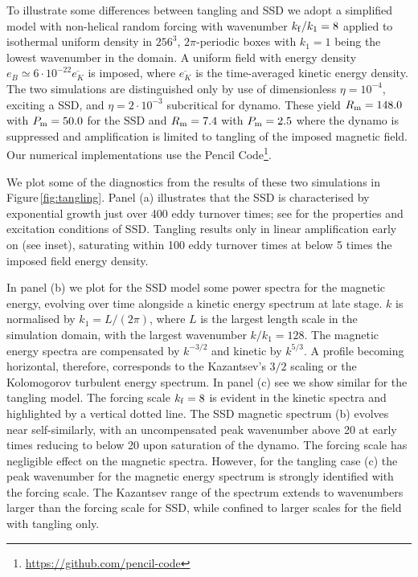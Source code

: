 \documentclass[preprint2]{aastex63}
\newcommand\kf{k_{\rm f} }
\begin{document}
To illustrate some differences between tangling and SSD we adopt
a simplified model with non-helical random forcing with wavenumber $\kf/k_1=8$
applied to isothermal uniform density in $256^3$, $2\pi$-periodic boxes with
$k_1=1$ being the lowest wavenumber in the domain.
A uniform field with energy density $e_B\simeq6\cdot10^{-22}\overline{e_K}$ is
imposed, where $\overline{e_K}$ is the time-averaged kinetic energy density.
The two simulations are distinguished only by use of dimensionless
$\eta=10^{-4}$, exciting a SSD, and $\eta=2\cdot10^{-3}$
subcritical for dynamo.
These yield $R_{\rm m}=148.0$ with $P_{\rm m}=50.0$ for the SSD and
$R_{\rm m}=7.4$ with $P_{\rm m}=2.5$ where the dynamo is suppressed and 
amplification is limited to tangling of the imposed magnetic field.
%
Our numerical implementations use the {\sc Pencil Code}\footnote{
\href{https://github.com/pencil-code}{https://github.com/pencil-code}}.

We plot some of the diagnostics from the results of these two simulations in 
Figure\,\ref{fig:tangling}.
Panel (a) illustrates that the SSD is characterised by
exponential growth just over 400 eddy turnover times; see \cite{ZRS83} for the
properties and excitation conditions of SSD.
Tangling results only in linear amplification early on (see inset), saturating
within 100 eddy turnover times at below 5 times the imposed field energy
density.

In panel (b) we plot for the SSD model some power spectra for the magnetic
energy, evolving over time alongside a kinetic energy spectrum at late stage.
$k$ is normalised by $k_1=L/(2\pi)$, where $L$ is the largest length scale in
the simulation domain, with the largest wavenumber $k/k_1=128$.
%
The magnetic energy spectra are compensated by $k^{-3/2}$ and kinetic by
$k^{5/3}$.
A profile becoming horizontal, therefore, corresponds to the Kazantsev's
$3/2$ scaling \citep{Sch02,BS14} or the Kolomogorov turbulent energy spectrum.
In panel (c) see we show similar for the tangling model.
The forcing scale $\kf=8$ is evident in the kinetic spectra and highlighted by 
a vertical dotted line.
The SSD magnetic spectrum (b) evolves near self-similarly, with an uncompensated
peak wavenumber above 20 at early times reducing to below 20 upon saturation of
the dynamo.
The forcing scale has negligible effect on the magnetic spectra.
However, for the tangling case (c) the peak wavenumber for the magnetic energy
spectrum is strongly identified with the forcing scale.
The Kazantsev range of the spectrum extends to wavenumbers larger than the 
forcing scale for SSD, while confined to larger scales for the field with
tangling only.
\end{document}
